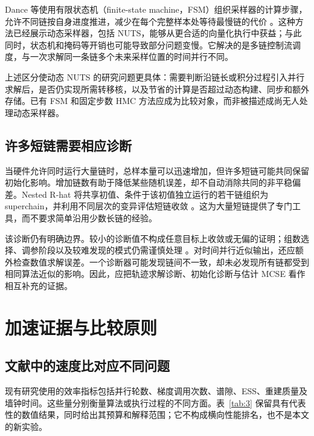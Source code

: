 \documentclass[UTF8,a4paper,zihao=-4,fontset=fandol]{ctexart}
\begin{document}
Dance 等使用有限状态机（finite-state machine，FSM）组织采样器的计算步骤，允许不同链按自身进度推进，减少在每个完整样本处等待最慢链的代价 \cite{dance2025}。这种方法已经展示动态采样器，包括 NUTS，能够从更合适的向量化执行中获益；与此同时，状态机和掩码等开销也可能导致部分问题变慢。它解决的是多链控制流调度，与一次求解同一条链多个未来采样位置的时间并行不同。

上述区分使动态 NUTS 的研究问题更具体：需要判断沿链长或积分过程引入并行求解后，是否仍实现所需转移核，以及节省的计算是否超过动态构建、同步和额外存储。已有 FSM 和固定步数 HMC 方法应成为比较对象，而非被描述成尚无人处理动态采样器。

\subsection{许多短链需要相应诊断}

当硬件允许同时运行大量链时，总样本量可以迅速增加，但许多短链可能共同保留初始化影响。增加链数有助于降低某些随机误差，却不自动消除共同的非平稳偏差。Nested R-hat 将共享初值、条件于该初值独立运行的若干链组织为 superchain，并利用不同层次的变异评估短链收敛 \cite{margossian2025}。这为大量短链提供了专门工具，而不要求简单沿用少数长链的经验。

该诊断仍有明确边界。较小的诊断值不构成任意目标上收敛或无偏的证明；组数选择、调参阶段以及较难发现的模式仍需谨慎处理 \cite{margossian2025}。对时间并行近似输出，还应额外检查数值求解误差。一个诊断器可能发现链间不一致，却未必发现所有链都受到相同算法近似的影响。因此，应把轨迹求解诊断、初始化诊断与估计 MCSE 看作相互补充的证据。

\section{加速证据与比较原则}

\subsection{文献中的速度比对应不同问题}

现有研究使用的效率指标包括并行轮数、梯度调用次数、谱隙、ESS、重建质量及墙钟时间。这些量分别衡量算法或执行过程的不同方面。表~\ref{tab:3} 保留具有代表性的数值结果，同时给出其预算和解释范围；它不构成横向性能排名，也不是本文的新实验。
\end{document}
